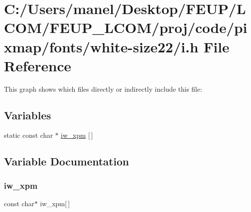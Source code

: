 \hypertarget{white-size22_2i_8h}{}\section{C\+:/\+Users/manel/\+Desktop/\+F\+E\+U\+P/\+L\+C\+O\+M/\+F\+E\+U\+P\+\_\+\+L\+C\+O\+M/proj/code/pixmap/fonts/white-\/size22/i.h File Reference}
\label{white-size22_2i_8h}
This graph shows which files directly or indirectly include this file\+:
\subsection*{Variables}
\begin{DoxyCompactItemize}
\item 
static const char $\ast$ \mbox{\hyperlink{white-size22_2i_8h_aa6debbc4bb360c171c1ea93ca614615c}{iw\+\_\+xpm}} \mbox{[}$\,$\mbox{]}
\end{DoxyCompactItemize}


\subsection{Variable Documentation}
\mbox{\label{white-size22_2i_8h_aa6debbc4bb360c171c1ea93ca614615c}} 
\subsubsection{\texorpdfstring{iw\_xpm}{iw\_xpm}}
{\footnotesize\ttfamily const char$\ast$ iw\+\_\+xpm\mbox{[}$\,$\mbox{]}\hspace{0.3cm}{\ttfamily [static]}}

